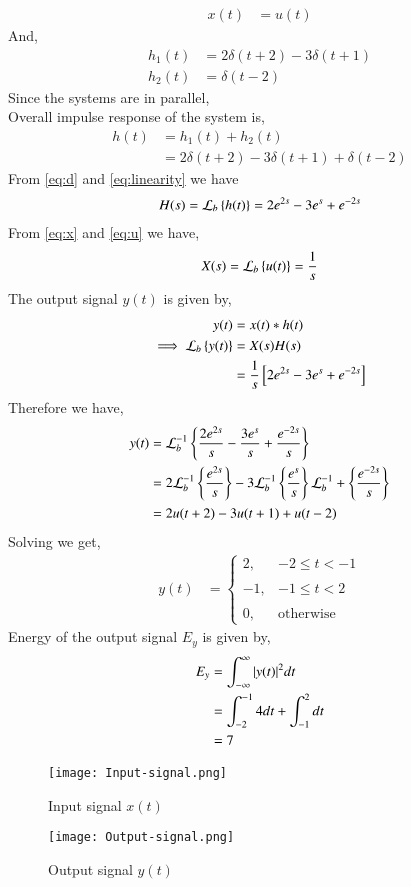 \documentclass[journal,12pt,twocolumn]{IEEEtran}
\begin{document}
\begin{align}
    x(t) &= u(t)\label{eq:x}
\end{align}
And,
\begin{align}
    h_1(t) &= 2\delta(t+2) - 3\delta(t+1)\\
    h_2(t) &= \delta(t-2)
\end{align}
Since the systems are in parallel,\\
Overall impulse response of the system is,
\begin{align}
    h(t) &= h_1(t) + h_2(t)\\  &= 2\delta(t+2) - 3\delta(t+1) + \delta(t-2)
\end{align}
From \eqref{eq:d} and \eqref{eq:linearity} we have
\begin{align}
    H(s) = \mathcal{L}_{b}\left\{h(t)\right\} = 2e^{2s}-3e^{s}+e^{-2s}
\end{align}
From \eqref{eq:x} and \eqref{eq:u} we have,
\begin{align}
    X(s) = \mathcal{L}_{b}\left\{u(t)\right\} = \frac{1}{s}
\end{align}
The output signal $y(t)$ is given by,
\begin{align}
    y(t) &= x(t)*h(t)\\ 
    \implies \mathcal{L}_{b}\left\{y(t)\right\} &= X(s)H(s)\\
    &= \frac{1}{s}{}\left[2e^{2s}-3e^{s}+e^{-2s}\right]
\end{align}
Therefore we have,
\begin{align}
    y(t) &= \mathcal{L}_{b}^{-1}\left\{\frac{2e^{2s}}{s}-\frac{3e^{s}}{s}+\frac{e^{-2s}}{s}\right\}\\
    &=2\mathcal{L}_{b}^{-1}\left\{\frac{e^{2s}}{s}\right\}-3\mathcal{L}_{b}^{-1}\left\{\frac{e^{s}}{s}\right\}\mathcal{L}_{b}^{-1}+\left\{\frac{e^{-2s}}{s}\right\}\\
     &= 2u(t+2) -3u(t+1) + u(t-2) 
\end{align}
Solving we get,
\begin{align}
      y(t) &= 
     \begin{cases}
    2, & -2 \leq t < -1 \\~\\[-1em]
	-1, & -1 \leq t < 2 \\~\\[-1em]
	0, & \text{otherwise}
	\end{cases}
\end{align}
Energy of the output signal $E_y$ is given by,
\begin{align}
    E_y &= \int_{-\infty}^{\infty}\vert y(t)\vert^2dt\\
    &= \int_{-2}^{-1}4dt + \int_{-1}^{2}dt\\
    &= 7
\end{align}
\begin{figure}[h!]
\centering
\texttt{[image: Input-signal.png]}
\caption{Input signal $x(t)$}
\label{fig:Input-signal}
\end{figure}

\begin{figure}[h!]
\centering
\texttt{[image: Output-signal.png]}
\caption{Output signal $y(t)$}
\label{fig:Output-signal}
\end{figure}
\end{document}
